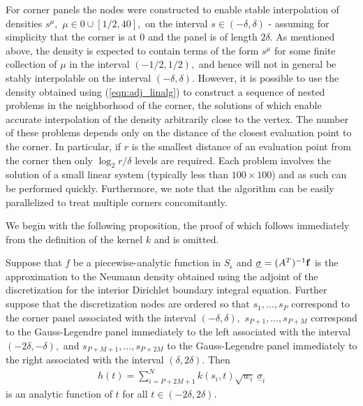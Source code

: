 For corner panels the nodes were constructed to enable stable interpolation of densities $s^\mu,$ $\mu \in 0 \cup [1/2,40],$ on the interval $s \in (-\delta,\delta)$ - assuming for simplicity that the corner is at $0$ and the panel is of length $2 \delta.$ As mentioned above, the density is expected to contain terms of the form $s^\mu$ for some finite collection of $\mu$ in the interval $(-1/2,1/2),$ and hence will not in general be stably interpolable on the interval $(-\delta,\delta).$ However, it is possible to use the density obtained using (\ref{eqn:adj_linalg}) to construct a sequence of nested problems in the neighborhood of the corner, the solutions of which enable accurate interpolation of the density arbitrarily close to the vertex. The number of these problems depends only on the distance of the closest evaluation point to the corner. In particular, if $r$ is the smallest distance of an evaluation point from the corner then only $\log_2 r/\delta$ levels are required. Each problem involves the solution of a small linear system (typically less than $100 \times 100$) and as such can be performed quickly. Furthermore, we note that the algorithm can be easily parallelized to treat multiple corners concomitantly.

We begin with the following proposition, the proof of which follows immediately from the definition of the kernel $k$ and is omitted.
\begin{proposition}
Suppose that $f$ be a piecewise-analytic function in $S_\epsilon$ and  $\underline{\sigma} = (A^T)^{-1} {\bf f}$ is the approximation to the Neumann density obtained using the adjoint of the discretization for the interior Dirichlet boundary integral equation. Further suppose that the discretization nodes are ordered so that $s_1,\dots,s_P$ correspond to the corner panel associated with the interval $(-\delta,\delta),$ $s_{P+1},\dots,s_{P+M}$ correspond to the Gauss-Legendre panel immediately to the left associated with the interval $(-2\delta,-\delta),$ and $s_{P+M+1},\dots,s_{P+2M}$ to the Gauss-Legendre panel immediately to the right associated with the interval $(\delta,2\delta).$
Then
\begin{align}
h(t) = \sum_{i=P+2M+1}^N k(s_i,t) \sqrt{w_i} \,\underline{\sigma}_i
\end{align}
is an analytic function of $t$ for all $t \in (-2\delta,2\delta).$
\end{proposition}

